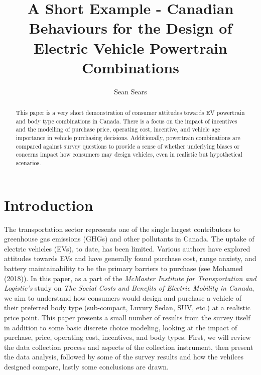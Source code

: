 \documentclass[]{elsarticle} %
\begin{document}
\begin{frontmatter}

  \title{A Short Example - Canadian Behaviours for the Design of Electric Vehicle
Powertrain Combinations}
    \author[McMaster Institute for Transportation and Logistics]{Sean Sears}
      \address[McMaster Institute for Transportation and Logistics]{McMaster Institute for Transportation and Logistics, School of Geography
and Earth Sciences, 1280 Main Street West, Hamilton, Ontario, L8S 4L8}
  
  \begin{abstract}
  This paper is a very short demonstration of consumer attitudes towards
  EV powertrain and body type combinations in Canada. There is a focus on
  the impact of incentives and the modelling of purchase price, operating
  cost, incentive, and vehicle age importance in vehicle purchasing
  decisions. Additionally, powertrain combinations are compared against
  survey questions to provide a sense of whether underlying biases or
  concerns impact how consumers may design vehicles, even in realistic but
  hypothetical scenarios.
  \end{abstract}
  
 \end{frontmatter}

\section{Introduction}\label{introduction}

The transportation sector represents one of the single largest
contributors to greenhouse gas emissions (GHGs) and other pollutants in
Canada. The uptake of electric vehicles (EVs), to date, has been
limited. Various authors have explored attitudes towards EVs and have
generally found purchase cost, range anxiety, and battery
maintainability to be the primary barriers to purchase (see Mohamed
(2018)). In this paper, as a part of the \emph{McMaster Institute for
Transportation and Logistic's} study on \emph{The Social Costs and
Benefits of Electric Mobility in Canada}, we aim to understand how
consumers would design and purchase a vehicle of their preferred body
type (sub-compact, Luxury Sedan, SUV, etc.) at a realistic price point.
This paper presents a small number of results from the survey itself in
addition to some basic discrete choice modeling, looking at the impact
of purchase, price, operating cost, incentives, and body types. First,
we will review the data collection process and aspects of the collection
instrument, then present the data analysis, followed by some of the
survey results and how the vehilces designed compare, lastly some
conclusions are drawn.
\end{document}
